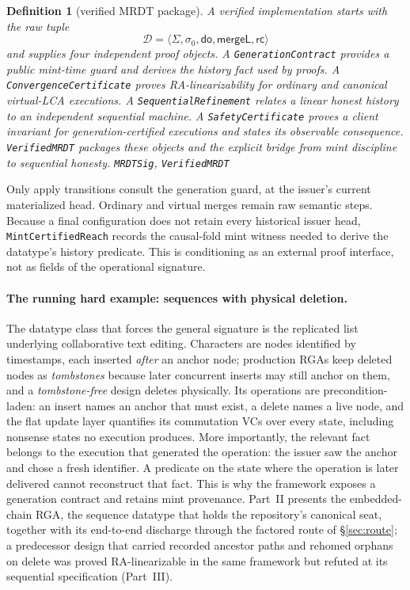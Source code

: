 \documentclass[11pt]{article}
\newtheorem{definition}[theorem]{Definition}
\newcommand{\rcrel}{\mathsf{rc}}                 %
\newcommand{\mergeL}{\mathsf{mergeL}}
\newcommand{\Sinit}{\sigma_0}
\newcommand{\lean}[1]{\texttt{#1}}
\newcommand{\M}[1]{\mathcal{#1}}
\begin{document}
\begin{definition}[verified MRDT package]
\label{def:condsig}
A verified implementation starts with the raw tuple
\[
  \M{D} = \langle \Sigma, \Sinit, \mathsf{do}, \mergeL, \rcrel\rangle
\]
and supplies four independent proof objects. A \lean{GenerationContract}
provides a public mint-time guard and derives the history fact used by proofs.
A \lean{ConvergenceCertificate} proves RA-linearizability for ordinary and
canonical virtual-LCA executions. A \lean{SequentialRefinement} relates a
linear honest history to an independent sequential machine. A
\lean{SafetyCertificate} proves a client invariant for generation-certified
executions and states its observable consequence. \lean{VerifiedMRDT} packages
these objects and the explicit bridge from mint discipline to sequential
honesty.
\hfill\lean{MRDTSig}, \lean{VerifiedMRDT}
\end{definition}

Only apply transitions consult the generation guard, at the issuer's current
materialized head. Ordinary and virtual merges remain raw semantic steps.
Because a final configuration does not retain every historical issuer head,
\lean{MintCertifiedReach} records the causal-fold mint witness needed to derive
the datatype's history predicate. This is conditioning as an external proof
interface, not as fields of the operational signature.

\paragraph{The running hard example: sequences with physical deletion.}
The datatype class that forces the general signature is the replicated
list underlying collaborative text editing. Characters are nodes
identified by timestamps, each inserted \emph{after} an anchor node;
production RGAs keep deleted nodes as \emph{tombstones} because later
concurrent inserts may still anchor on them, and a \emph{tombstone-free}
design deletes physically. Its operations are precondition-laden: an
insert names an anchor that must exist, a delete names a live node, and
the flat update layer quantifies its commutation VCs over every state,
including nonsense states no execution produces. More importantly, the
relevant fact belongs to the execution that generated the operation: the
issuer saw the anchor and chose a fresh identifier. A predicate on the state
where the operation is later delivered cannot reconstruct that fact. This is
why the framework exposes a generation contract and retains mint provenance.
Part~II presents the
embedded-chain RGA, the sequence datatype that holds the repository's
canonical seat, together with its end-to-end discharge through the
factored route of \S\ref{sec:route}; a predecessor design that carried
recorded ancestor paths and rehomed orphans on delete was proved
RA-linearizable in the same framework but refuted at its
sequential specification (Part~III).
\end{document}
